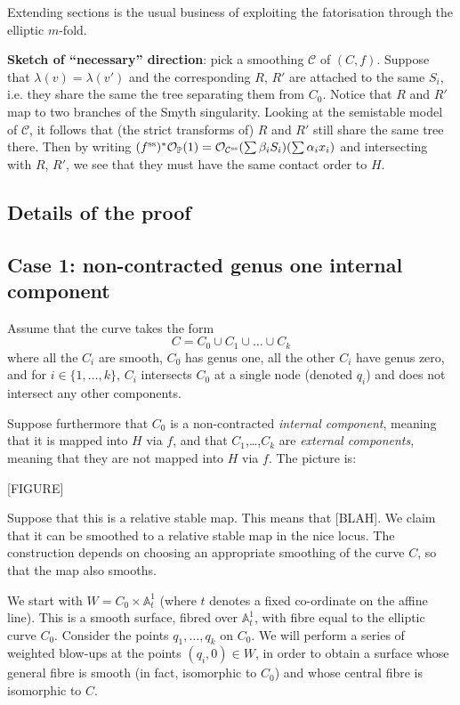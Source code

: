 \documentclass[11pt]{amsart}
\newcommand{\PP}{\mathbb P}
\newcommand{\OO}{\mathcal{O}}
\newcommand{\cC}{\mathcal C}
\newcommand{\Aaff}{\mathbb{A}}
\theoremstyle{definition}
\theoremstyle{definition}
\begin{document}
Extending sections is the usual business of exploiting the fatorisation through the elliptic $m$-fold.

\textbf{Sketch of ``necessary'' direction}: pick a smoothing $\cC$ of $(C,f)$. Suppose that $\lambda(v)=\lambda(v')$ and the corresponding $R$, $R'$ are attached to the same $S_i$, i.e. they share the same the tree separating them from $C_0$. Notice that $R$ and $R'$ map to two branches of the Smyth singularity. Looking at the semistable model of $\cC$, it follows that (the strict transforms of) $R$ and $R'$ still share the same tree there. Then by writing $(f^{\rm{ss}})^*\OO_{\PP}(1)=\OO_{\cC^{\rm{ss}}}(\sum \beta_iS_i)(\sum \alpha_ix_i)$ and intersecting with $R$, $R'$, we see that they must have the same contact order to $H$.

\subsection{Details of the proof}

\subsection*{Case 1: non-contracted genus one internal component} Assume that the curve takes the form
\begin{equation*} C = C_0 \cup C_1 \cup \ldots \cup C_k \end{equation*}
where all the $C_i$ are smooth, $C_0$ has genus one, all the other $C_i$ have genus zero, and for $i \in \{1,\ldots,k\}$, $C_i$ intersects $C_0$ at a single node (denoted $q_i$) and does not intersect any other components.

Suppose furthermore that $C_0$ is a non-contracted \emph{internal component}, meaning that it is mapped into $H$ via $f$, and that $C_1$,\ldots,$C_k$ are \emph{external components}, meaning that they are not mapped into $H$ via $f$. The picture is:

[FIGURE]

Suppose that this is a relative stable map. This means that [BLAH]. We claim that it can be smoothed to a relative stable map in the nice locus. The construction depends on choosing an appropriate smoothing of the curve $C$, so that the map also smooths.

We start with $W = C_0 \times \Aaff^1_t$ (where $t$ denotes a fixed co-ordinate on the affine line). This is a smooth surface, fibred over $\Aaff^1_t$, with fibre equal to the elliptic curve $C_0$. Consider the points $q_1, \ldots, q_k$ on $C_0$. We will perform a series of weighted blow-ups at the points $(q_i,0) \in W$, in order to obtain a surface whose general fibre is smooth (in fact, isomorphic to $C_0$) and whose central fibre is isomorphic to $C$.
\end{document}
